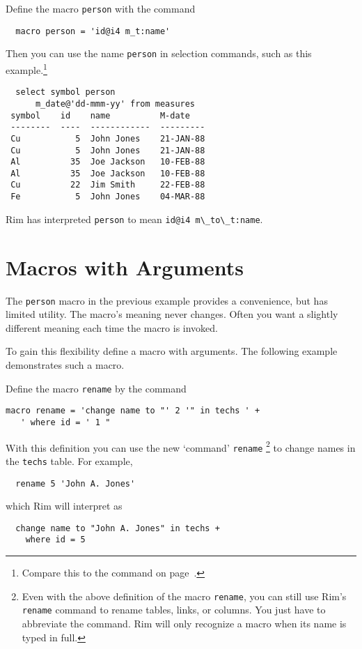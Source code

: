 \documentclass[11pt,a4paper]{report}
\def\I{\index}
\begin{document}
Define the macro \verb!person! with the command
\begin{verbatim}
  macro person = 'id@i4 m_t:name'
\end{verbatim}

Then you can use the name \verb!person! in selection commands, such as
this example.\footnote{Compare this to the command on
page~\pageref{sel-dem1}.}
 
\I{select}
\begin{verbatim}
  select symbol person 
      m_date@'dd-mmm-yy' from measures
 symbol    id    name          M-date
 --------  ----  ------------  ---------
 Cu           5  John Jones    21-JAN-88
 Cu           5  John Jones    21-JAN-88
 Al          35  Joe Jackson   10-FEB-88
 Al          35  Joe Jackson   10-FEB-88
 Cu          22  Jim Smith     22-FEB-88
 Fe           5  John Jones    04-MAR-88
\end{verbatim}
 
Rim has interpreted \verb!person! to mean
\verb!id@i4 m\_to\_t:name!.
 
\section{Macros with Arguments}
The \verb!person! macro in the previous example provides a convenience,
but has limited utility.  The macro's meaning never changes.
Often you want a slightly different meaning
each time the macro is invoked.
 
To gain this flexibility define a macro
with arguments.
\I{argument}
The following example demonstrates such a macro.
 
Define the macro \verb!rename! by the command
\begin{verbatim}
macro rename = 'change name to "' 2 '" in techs ' +
   ' where id = ' 1 "
\end{verbatim}
\label{rename-def}
 
With this definition
you can use the new `command' \verb!rename!
   \footnote{ Even with the above definition of the macro
   {\tt rename}, you can
    still use Rim's {\tt rename} command to rename tables, links, or
   columns.  You just have to abbreviate the command.
   Rim will only recognize a macro when its name
   is typed in full.}
to change names in
the \verb!techs! table. For example,
\begin{verbatim}
  rename 5 'John A. Jones' 
\end{verbatim}
which Rim will interpret as
\begin{verbatim}
  change name to "John A. Jones" in techs +
    where id = 5 
\end{verbatim}
 
\end{document}
